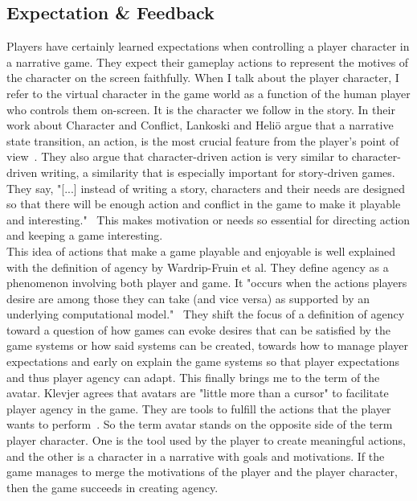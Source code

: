 \subsection{Expectation \& Feedback}
\label{section:expfee}
Players have certainly learned expectations when controlling a player character in a narrative game. They expect their gameplay actions to represent the motives of the character on the screen faithfully. When I talk about the player character, I refer to the virtual character in the game world as a function of the human player who controls them on-screen. It is the character we follow in the story. In their work about Character and Conflict, Lankoski and Heliö argue that a narrative state transition, an action, is the most crucial feature from the player’s point of view~\cite{Lankoski2002}. They also argue that character-driven action is very similar to character-driven writing, a similarity that is especially important for story-driven games. They say, "[...] instead of writing a story, characters and their needs are designed so that there will be enough action and conflict in the game to make it playable and interesting."~\cite{Lankoski2002} This makes motivation or needs so essential for directing action and keeping a game interesting.\\
This idea of actions that make a game playable and enjoyable is well explained with the definition of agency by Wardrip-Fruin et al. They define agency as a phenomenon involving both player and game. It "occurs when the actions players desire are among those they can take (and vice versa) as supported by an underlying computational model."~\cite{Rohtua2009} They shift the focus of a definition of agency toward a question of how games can evoke desires that can be satisfied by the game systems or how said systems can be created, towards how to manage player expectations and early on explain the game systems so that player expectations and thus player agency can adapt. This finally brings me to the term of the avatar. Klevjer agrees that avatars are "little more than a cursor" to facilitate player agency in the game. They are tools to fulfill the actions that the player wants to perform~\cite{Klevjer2012}. So the term avatar stands on the opposite side of the term player character. One is the tool used by the player to create meaningful actions, and the other is a character in a narrative with goals and motivations. If the game manages to merge the motivations of the player and the player character, then the game succeeds in creating agency.\\
